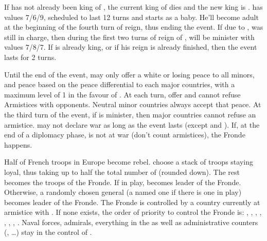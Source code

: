 
\phevnt
\aparag If  has not already been king of \FRA, the current
king of \FRA dies and the new king is .
\bparag {} has values 7/6/9, scheduled to last 12 turns and
starts as a baby.
\bparag He'll become adult at the beginning of the fourth turn of reign, thus
ending the event.
\aparag If due to ,  was still in
charge, then during the first two turns of reign of ,
 will be minister with values 7/8/7.
\aparag If  is already king, or if his reign is already
finished, then the event lasts for 2 turns.

\phdipl
\aparag Until the end of the event, \FRA may only offer a white or losing
peace to all minors, and peace based on the peace differential to each major
countries, with a maximum level of 1 in the favour of \FRA.
\bparag At each turn, \FRA offer and cannot refuse Armistices with opponents.
\bparag Neutral minor countries always accept that peace.
\bparag At the third turn of the event, if  is minister,
then major countries cannot refuse an armistice.
\aparag \FRA may not declare war as long as the event lasts (except
 and ).
\aparag If, at the end of a diplomacy phase, \FRA is not at war (don't count
armistices), the Fronde happens.


\phdipl
\aparag Half of French troops in Europe become rebel. \FRA choose a stack of
troops staying loyal, thus taking up to half the total number of \LD (rounded
down). The rest becomes the troops of the Fronde.
\bparag If in play, \leaderConde becomes leader of the Fronde. Otherwise, a
randomly chosen general (a named one if there is one in play) becomes leader
of the Fronde.
\aparag The Fronde is controlled by a country currently at armistice with
\FRA. If none exists, the order of priority to control the Fronde is: \HIS,
\ANG, \HOL, \AUS, \POL, \RUS, \SUE, \TUR.
\aparag Naval forces, admirals, everything in the \ROTW as well as
administrative counters (\MNU, \ldots) stay in the control of \FRA.

